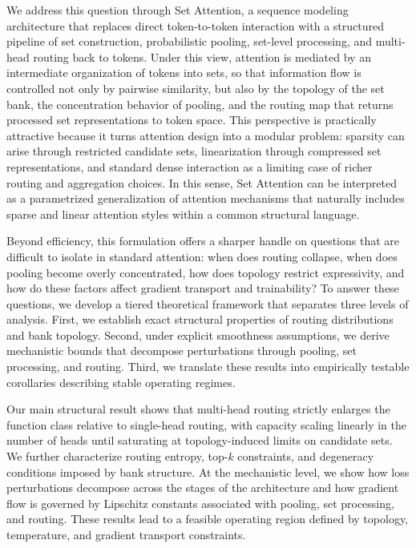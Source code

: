 \documentclass{article}
\theoremstyle{plain}
\theoremstyle{definition}
\theoremstyle{remark}
\begin{document}
We address this question through Set Attention, a sequence modeling architecture that replaces direct token-to-token interaction with a structured pipeline of set construction, probabilistic pooling, set-level processing, and multi-head routing back to tokens. Under this view, attention is mediated by an intermediate organization of tokens into sets, so that information flow is controlled not only by pairwise similarity, but also by the topology of the set bank, the concentration behavior of pooling, and the routing map that returns processed set representations to token space. This perspective is practically attractive because it turns attention design into a modular problem: sparsity can arise through restricted candidate sets, linearization through compressed set representations, and standard dense interaction as a limiting case of richer routing and aggregation choices. In this sense, Set Attention can be interpreted as a parametrized generalization of attention mechanisms that naturally includes sparse and linear attention styles within a common structural language.

Beyond efficiency, this formulation offers a sharper handle on questions that are difficult to isolate in standard attention: when does routing collapse, when does pooling become overly concentrated, how does topology restrict expressivity, and how do these factors affect gradient transport and trainability? To answer these questions, we develop a tiered theoretical framework that separates three levels of analysis. First, we establish exact structural properties of routing distributions and bank topology. Second, under explicit smoothness assumptions, we derive mechanistic bounds that decompose perturbations through pooling, set processing, and routing. Third, we translate these results into empirically testable corollaries describing stable operating regimes.

Our main structural result shows that multi-head routing strictly enlarges the function class relative to single-head routing, with capacity scaling linearly in the number of heads until saturating at topology-induced limits on candidate sets. We further characterize routing entropy, top-$k$ constraints, and degeneracy conditions imposed by bank structure. At the mechanistic level, we show how loss perturbations decompose across the stages of the architecture and how gradient flow is governed by Lipschitz constants associated with pooling, set processing, and routing. These results lead to a feasible operating region defined by topology, temperature, and gradient transport constraints.
\end{document}

